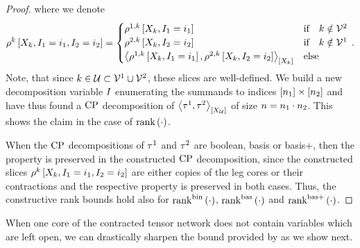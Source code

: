\begin{proof}
    where we denote
    \begin{align*}
        \rho^{k}\left[X_{k},I_{1}=i_{1},I_{2}=i_{2}\right]
        = \begin{cases}
              \rho^{1,k}\left[X_{k},I_{1}=i_{1}\right]  & \text{if}\quad k \notin \mathcal{V}^{2} \\
              \rho^{2,k}\left[X_{k},I_{2}=i_{2}\right]  & \text{if}\quad k \notin \mathcal{V}^{1} \\
              \left\langle \rho^{1,k}\left[X_{k},I_{1}=i_{1}\right], \rho^{2,k}\left[X_{k},I_{2}=i_{2}\right]\right\rangle_{\left[ X_{k} \right]}  & \text{else}
        \end{cases} \, .
    \end{align*}
    Note, that since $k\in\mathcal{U}\subset\mathcal{V}^{1}\cup\mathcal{V}^{2}$, these slices are well-defined.
    We build a new decomposition variable $I$ enumerating the summands to indices $[n_{1}]\times[n_{2}]$ and have thus found a $\mathrm{CP}$ decomposition of $\left\langle \tau^{1},\tau^{2}\right\rangle_{\left[ X_{\mathcal{U}} \right]}$ of size $n=n_{1}\cdot n_{2}$.
    This shows the claim in the case of $\mathrm{rank}\left(\cdot\right)$.

    When the $\mathrm{CP}$ decompositions of $\tau^{1}$ and $\tau^{2}$ are boolean, basis or basis+, then the property is preserved in the constructed $\mathrm{CP}$ decomposition, since the constructed slices $\rho^{k}\left[X_{k},I_{1}=i_{1},I_{2}=i_{2}\right]$ are either copies of the leg cores or their contractions and the respective property is preserved in both cases.
    Thus, the constructive rank bounds hold also for $\mathrm{rank}^{\mathrm{bin}}\left(\cdot\right)$, $\mathrm{rank}^{\mathrm{bas}}\left(\cdot\right)$ and $\mathrm{rank}^{\mathrm{bas+}}\left(\cdot\right)$.
\end{proof}

When one core of the contracted tensor network does not contain variables which are left open, we can drastically sharpen the bound provided by  as we show next.

